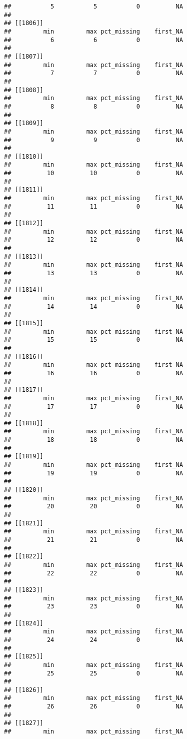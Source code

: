 \documentclass[
]{article}
\begin{document}
\begin{verbatim}
##           5           5           0          NA 
## 
## [[1806]]
##         min         max pct_missing    first_NA 
##           6           6           0          NA 
## 
## [[1807]]
##         min         max pct_missing    first_NA 
##           7           7           0          NA 
## 
## [[1808]]
##         min         max pct_missing    first_NA 
##           8           8           0          NA 
## 
## [[1809]]
##         min         max pct_missing    first_NA 
##           9           9           0          NA 
## 
## [[1810]]
##         min         max pct_missing    first_NA 
##          10          10           0          NA 
## 
## [[1811]]
##         min         max pct_missing    first_NA 
##          11          11           0          NA 
## 
## [[1812]]
##         min         max pct_missing    first_NA 
##          12          12           0          NA 
## 
## [[1813]]
##         min         max pct_missing    first_NA 
##          13          13           0          NA 
## 
## [[1814]]
##         min         max pct_missing    first_NA 
##          14          14           0          NA 
## 
## [[1815]]
##         min         max pct_missing    first_NA 
##          15          15           0          NA 
## 
## [[1816]]
##         min         max pct_missing    first_NA 
##          16          16           0          NA 
## 
## [[1817]]
##         min         max pct_missing    first_NA 
##          17          17           0          NA 
## 
## [[1818]]
##         min         max pct_missing    first_NA 
##          18          18           0          NA 
## 
## [[1819]]
##         min         max pct_missing    first_NA 
##          19          19           0          NA 
## 
## [[1820]]
##         min         max pct_missing    first_NA 
##          20          20           0          NA 
## 
## [[1821]]
##         min         max pct_missing    first_NA 
##          21          21           0          NA 
## 
## [[1822]]
##         min         max pct_missing    first_NA 
##          22          22           0          NA 
## 
## [[1823]]
##         min         max pct_missing    first_NA 
##          23          23           0          NA 
## 
## [[1824]]
##         min         max pct_missing    first_NA 
##          24          24           0          NA 
## 
## [[1825]]
##         min         max pct_missing    first_NA 
##          25          25           0          NA 
## 
## [[1826]]
##         min         max pct_missing    first_NA 
##          26          26           0          NA 
## 
## [[1827]]
##         min         max pct_missing    first_NA 

\end{verbatim}
\end{document}
